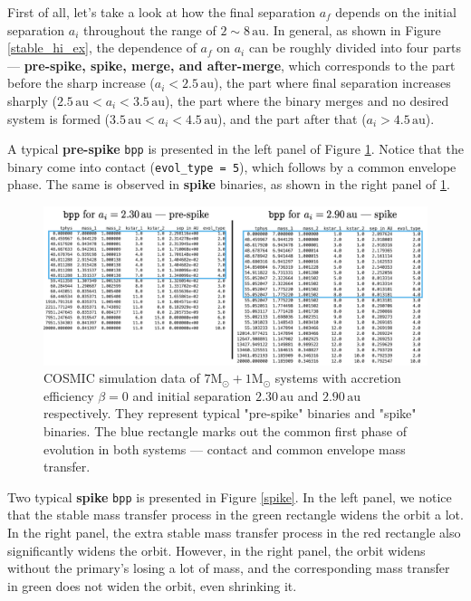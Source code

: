 \documentclass[12pt]{article}
\newcommand{\Msun}{\mathrm{M_{\odot}}}
\newcommand{\au}{\, \mathrm{au}}
\begin{document}
First of all, let's take a look at how the final separation $a_f$ depends on the initial separation $a_i$ throughout the range of $2 \sim 8 \au$. In general, as shown in Figure \ref{stable_hi_ex}, the dependence of $a_f$ on $a_i$ can be roughly divided into four parts — \textbf{pre-spike, spike, merge, and after-merge}, which corresponds to the part before the sharp increase ($a_i < 2.5 \au$), the part where final separation increases sharply ($2.5 \au < a_i < 3.5 \au$), the part where the binary merges and no desired system is formed ($3.5 \au < a_i < 4.5 \au$), and the part after that ($a_i > 4.5 \au$).

A typical \textbf{pre-spike} \verb|bpp| is presented in the left panel of Figure \ref{pre-spike-spike}. Notice that the binary come into contact (\verb|evol_type = 5|), which follows by a common envelope phase. The same is observed in \textbf{spike} binaries, as shown in the right panel of \ref{pre-spike-spike}.

\begin{figure}
    \centering
    \includegraphics[width=\linewidth]{pre-spike-spike.png}
    \caption{COSMIC simulation data of $7 \Msun + 1 \Msun$ systems with accretion efficiency $\beta = 0$ and initial separation $2.30 \au$ and $2.90 \au$ respectively. They represent typical "pre-spike" binaries and "spike" binaries. The blue rectangle marks out the common first phase of evolution in both systems — contact and common envelope mass transfer.}
    \label{pre-spike-spike}
\end{figure}

Two typical \textbf{spike} \verb|bpp| is presented in Figure \ref{spike}. In the left panel, we notice that the stable mass transfer process in the green rectangle widens the orbit a lot. In the right panel, the extra stable mass transfer process in the red rectangle also significantly widens the orbit. However, in the right panel, the orbit widens without the primary's losing a lot of mass, and the corresponding mass transfer in green does not widen the orbit, even shrinking it.
\end{document}
